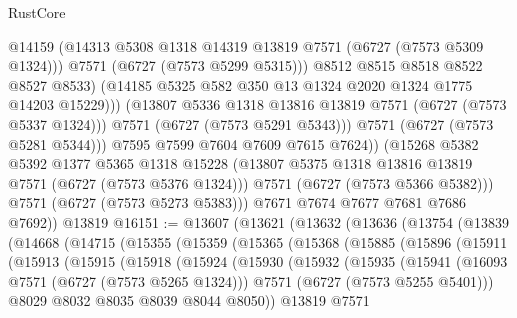 \begin{lexlean}{RustCore}
\begin{coremodule}
                          @14159
                          (@14313 @5308 @1318 @14319 @13819 @7571 (@6727 (@7573 @5309 @1324)))
                          @7571
                          (@6727 (@7573 @5299 @5315)))
                        @8512
                        @8515
                        @8518
                        @8522
                        @8527
                        @8533)
                      (@14185 @5325 @582 @350 @13 @1324 @2020 @1324 @1775 @14203 @15229)))
                  (@13807 @5336 @1318 @13816 @13819 @7571 (@6727 (@7573 @5337 @1324)))
                  @7571
                  (@6727 (@7573 @5291 @5343)))
                @7571
                (@6727 (@7573 @5281 @5344)))
              @7595
              @7599
              @7604
              @7609
              @7615
              @7624))
          (@15268
            @5382
            @5392
            @1377
            @5365
            @1318
            @15228
            (@13807 @5375 @1318 @13816 @13819 @7571 (@6727 (@7573 @5376 @1324)))
            @7571
            (@6727 (@7573 @5366 @5382)))
          @7571
          (@6727 (@7573 @5273 @5383)))
        @7671
        @7674
        @7677
        @7681
        @7686
        @7692))
    @13819
@16151 := @13607
    (@13621
      (@13632
        (@13636
          (@13754
            (@13839
              (@14668
                (@14715
                  (@15355
                    (@15359
                      (@15365
                        (@15368
                          (@15885
                            (@15896
                              (@15911
                                (@15913
                                  (@15915
                                    (@15918
                                      (@15924
                                        (@15930
                                          (@15932
                                            (@15935
                                              (@15941
                                                (@16093 @7571 (@6727 (@7573 @5265 @1324)))
                                                @7571
                                                (@6727 (@7573 @5255 @5401)))
                                              @8029
                                              @8032
                                              @8035
                                              @8039
                                              @8044
                                              @8050))
                                          @13819
                                          @7571

\end{coremodule}
\end{lexlean}
